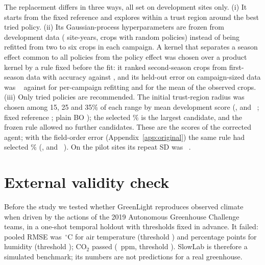 The replacement differs in three ways, all set on development sites only. (i) It starts from the fixed reference and explores within a trust region around the best tried policy. (ii) Its Gaussian-process hyperparameters are frozen from development data ( site-years,  crops with random policies) instead of being refitted from two to six crops in each campaign. A kernel that separates a season effect common to all policies from the policy effect was chosen over a product kernel by a rule fixed before the fit: it ranked second-season crops from first-season data with accuracy  against , and its held-out error on campaign-sized data was ~\eur{} against  for per-campaign refitting and  for the mean of the observed crops. (iii) Only tried policies are recommended. The initial trust-region radius was chosen among 15, 25 and 35\% of each range by mean development score (,  and ~\eur{}; fixed reference ; plain BO ); the selected \% is the largest candidate, and the frozen rule allowed no further candidates. These are the scores of the corrected agent; with the field-order error (Appendix~\ref{app:original}) the same rule had selected \% (,  and ~\eur{}). On the pilot sites its repeat SD was ~\eur{}.

\section{External validity check}
\label{app:external}
Before the study we tested whether GreenLight reproduces observed climate when driven by the actions of the 2019 Autonomous Greenhouse Challenge teams, in a one-shot temporal holdout with thresholds fixed in advance. It failed: pooled RMSE was \,$^\circ$C for air temperature (threshold ) and  percentage points for humidity (threshold ); CO$_2$ passed (~ppm, threshold ). SlowLab is therefore a simulated benchmark; its numbers are not predictions for a real greenhouse.

